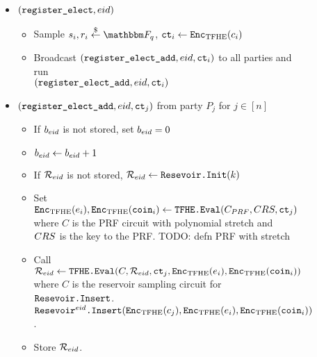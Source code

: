 \begin{figure}
{\begin{minipage}{1\textwidth}
\begin{itemize}
				\item $(\texttt{register\_elect}, {eid})$
				      \begin{itemize}
					      \item Sample $s_i, r_i \randomGet \F_q$, $\texttt{ct}_i \gets \texttt{Enc}_{\mathrm{TFHE}}(c_i)$
					      \item Broadcast $(\texttt{register\_elect\_add}, {eid}, \texttt{ct}_i)$ to all parties and run \\$(\texttt{register\_elect\_add}, {eid}, \texttt{ct}_i)$
				      \end{itemize}
				\item $(\texttt{register\_elect\_add}, {eid}, \texttt{ct}_j)$ from party $P_j$ for $j \in [n]$
				      \begin{itemize}
					      \item If $b_{eid}$ is not stored, set $b_{eid} = 0$
					      \item $b_{eid} \gets b_{eid}+1$
					      \item If $\mathcal{R}_{eid}$ is not stored, $\mathcal{R}_{eid} \gets \texttt{Resevoir.Init}(k)$
					      \item Set $\texttt{Enc}_{\mathrm{TFHE}}(e_i), \texttt{Enc}_{\mathrm{TFHE}}(\texttt{coin}_i) \gets \texttt{TFHE.Eval}(C_{PRF}, CRS, \texttt{ct}_j)$
					            where $C$ is the PRF circuit with polynomial stretch and $CRS$ is the key to the PRF. TODO: defn PRF with stretch
					      \item Call $\mathcal{R}_{eid} \gets \texttt{TFHE.Eval}(C, \mathcal{R}_{eid}, \texttt{ct}_j, \texttt{Enc}_{\mathrm{TFHE}}(e_i), \texttt{Enc}_{\mathrm{TFHE}}(\texttt{coin}_i))$ where
					            $C$ is the reservoir sampling circuit for $\texttt{Resevoir.Insert}$. %
					            $\texttt{Resevoir}^{{eid}}\texttt{.Insert}(\texttt{Enc}_{\mathrm{TFHE}}(c_j), \texttt{Enc}_{\mathrm{TFHE}}(e_i), \texttt{Enc}_{\mathrm{TFHE}}(\texttt{coin}_i))$.
					      \item Store $\mathcal{R}_{eid}$.
				      \end{itemize}


\end{itemize}
\end{minipage}}
\end{figure}
